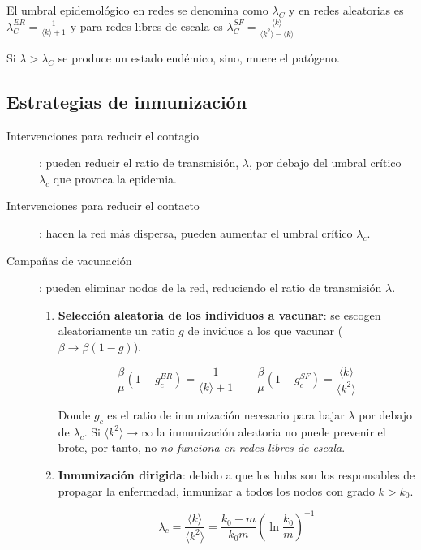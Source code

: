 \documentclass[10pt,spanish, landscape, twocolumn]{article}
\begin{document}
El umbral epidemológico en redes se denomina como $\lambda_C$ y en redes aleatorias es $\lambda_C^{ER} = \frac{1}{\langle k \rangle+1}$ y para redes libres de escala es $\lambda_C^{SF} = \frac{\langle k \rangle}{\langle k^2 \rangle - \langle k \rangle}$

Si $\lambda > \lambda_C$ se produce un estado endémico, sino, muere el patógeno.

\subsection{\textcolor{temasiete}Estrategias de inmunización}

\begin{description}
    \item[Intervenciones para reducir el contagio]: pueden reducir el ratio de transmisión, $\lambda$, por debajo del umbral crítico $\lambda_c$ que provoca la epidemia.
    \item[Intervenciones para reducir el contacto]: hacen la red más dispersa, pueden aumentar el umbral crítico $\lambda_c$.
    \item[Campañas de vacunación]: pueden eliminar nodos de la red, reduciendo el ratio de transmisión $\lambda$.
    \begin{enumerate}[\color{temasiete}{$\bigstar$}]
        \item \textbf{\textcolor{temasiete}{Selección aleatoria de los individuos a vacunar}}: se escogen aleatoriamente un ratio $g$ de inviduos a los que vacunar ($\beta \rightarrow \beta (1 - g)$).

        \begin{displaymath}
            \frac{\beta}{\mu} (1 - g_c^{ER}) = \frac{1}{\langle k \rangle + 1} \qquad \frac{\beta}{\mu} (1 - g_c^{SF}) = \frac{\langle k \rangle}{\langle k^2 \rangle}
        \end{displaymath}

        Donde $g_c$ es el ratio de inmunización necesario para bajar $\lambda$ por debajo de $\lambda_c$. Si $\langle k^2 \rangle \rightarrow \infty$ la inmunización aleatoria no puede prevenir el brote, por tanto, no \textit{\textcolor{temasiete}{no funciona en redes libres de escala}}.

        \item \textbf{\textcolor{temasiete}{Inmunización dirigida}}: debido a que los hubs son los responsables de propagar la enfermedad, inmunizar a todos los nodos con grado $k > k_0$.

        \begin{displaymath}
            \lambda_c = \frac{\langle k \rangle}{\langle k^2 \rangle} = \frac{k_0 - m}{k_0 m} \left(\ln \frac{k_0}{m} \right)^{-1}
        \end{displaymath}


\end{enumerate}
\end{description}
\end{document}
